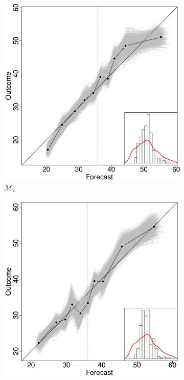 \documentclass[11pt]{article}
\theoremstyle{definition}
\theoremstyle{definition}
\begin{document}
\begin{figure}
\begin{subfigure}[b]{0.24\textwidth}
                \includegraphics[width=\textwidth]{IndependentModel2}
                \caption{$\mathcal{M}_2$}
                \label{fig:tiger}
        \end{subfigure}
        \begin{subfigure}[b]{0.24\textwidth}
                \includegraphics[width=\textwidth]{DependentModel2}

\end{subfigure}
\end{figure}
\end{document}
